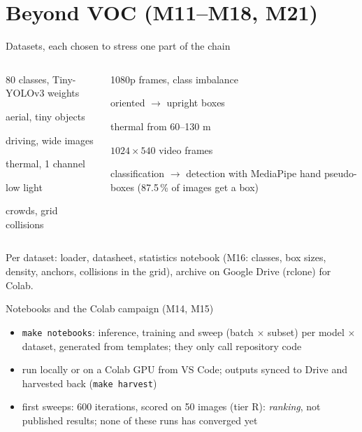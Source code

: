 \documentclass[aspectratio=169,11pt]{beamer}
\begin{document}
\section{Beyond VOC (M11--M18, M21)}

\begin{frame}{Datasets, each chosen to stress one part of the chain}
  \small
  \begin{columns}[T]
    \begin{description}[CrowdHuman]
      \item[COCO] 80 classes, Tiny-YOLOv3 weights
      \item[VisDrone] aerial, tiny objects
      \item[KITTI] driving, wide images
      \item[FLIR] thermal, 1 channel
      \item[ExDark] low light
      \item[CrowdHuman] crowds, grid collisions
    \end{description}
    \begin{description}[DroneVehicle]
      \item[AU-AIR] 1080p frames, class imbalance
      \item[DroneVehicle] oriented $\to$ upright boxes
      \item[HIT-UAV] thermal from 60--130 m
      \item[UAVDT] $1024\times540$ video frames
      \item[ASL] classification $\to$ detection with MediaPipe hand pseudo-boxes
        (87.5\,\% of images get a box)
    \end{description}
  \end{columns}
  \medskip
  Per dataset: loader, datasheet, statistics notebook (M16: classes, box sizes, density,
  anchors, collisions in the grid), archive on Google Drive (rclone) for Colab.
\end{frame}

\begin{frame}{Notebooks and the Colab campaign (M14, M15)}
  \small
  \begin{itemize}
      \item \texttt{make notebooks}: inference, training and sweep (batch $\times$ subset)
        per model $\times$ dataset, generated from templates; they only call repository
        code
      \item run locally or on a Colab GPU from VS Code; outputs synced to Drive and
        harvested back (\texttt{make harvest})
      \item first sweeps: 600 iterations, scored on 50 images (tier R): \emph{ranking}, not
        published results; none of these runs has converged yet
  \end{itemize}
\end{frame}
\end{document}
